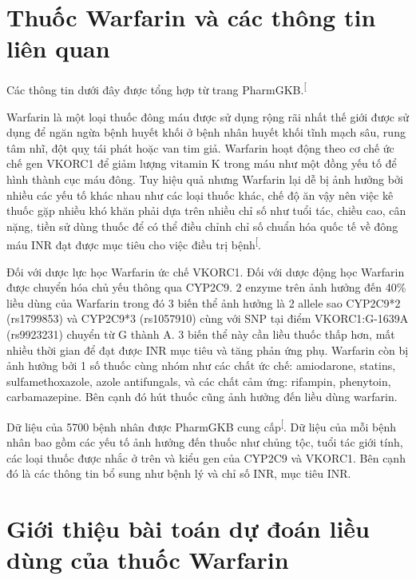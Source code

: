 \documentclass[14pt,oneside]{scrbook}
\begin{document}
\section{Thuốc Warfarin và các thông tin liên
quan}\label{thuux1ed1c-warfarin-vuxe0-cuxe1c-thuxf4ng-tin-liuxean-quan}

Các thông tin dưới đây được tổng hợp từ trang
PharmGKB.\textsuperscript{{[}\citeproc{ref-warfarin1}{1}{]}}

Warfarin là một loại thuốc đông máu được sử dụng rộng rãi nhất thế giới
được sử dụng để ngăn ngừa bệnh huyết khối ở bệnh nhân huyết khối tĩnh
mạch sâu, rung tâm nhĩ, đột quỵ tái phát hoặc van tim giả. Warfarin hoạt
động theo cơ chế ức chế gen VKORC1 để giảm lượng vitamin K trong máu như
một đồng yếu tố để hình thành cục máu đông. Tuy hiệu quả nhưng Warfarin
lại dễ bị ảnh hưởng bởi nhiều các yếu tố khác nhau như các loại thuốc
khác, chế độ ăn vậy nên việc kê thuốc gặp nhiều khó khăn phải dựa trên
nhiều chỉ số như tuổi tác, chiều cao, cân nặng, tiền sử dùng thuốc để có
thể điều chỉnh chỉ số chuẩn hóa quốc tế về đông máu INR đạt được mục
tiêu cho việc điều trị
bệnh\textsuperscript{{[}\citeproc{ref-inr}{5}{]}}.

Đối với dược lực học Warfarin ức chế VKORC1. Đối với dược động học
Warfarin được chuyển hóa chủ yếu thông qua CYP2C9. 2 enzyme trên ảnh
hưởng đến 40\% liều dùng của Warfarin trong đó 3 biến thể ảnh hưởng là 2
allele sao CYP2C9*2 (rs1799853) và CYP2C9*3 (rs1057910) cùng với SNP tại
điểm VKORC1:G-1639A (rs9923231) chuyển từ G thành A. 3 biến thể này cần
liều thuốc thấp hơn, mất nhiều thời gian để đạt được INR mục tiêu và
tăng phản ứng phụ. Warfarin còn bị ảnh hưởng bởi 1 số thuốc cùng nhóm
như các chất ức chế: amiodarone, statins, sulfamethoxazole, azole
antifungals, và các chất cảm ứng: rifampin, phenytoin, carbamazepine.
Bên cạnh đó hút thuốc cũng ảnh hưởng đến liều dùng warfarin.

Dữ liệu của 5700 bệnh nhân được PharmGKB cung
cấp\textsuperscript{{[}\citeproc{ref-warfarin-data}{6}{]}}. Dữ liệu của
mỗi bệnh nhân bao gồm các yếu tố ảnh hưởng đến thuốc như chủng tộc, tuổi
tác giới tính, các loại thuốc được nhắc ở trên và kiểu gen của CYP2C9 và
VKORC1. Bên cạnh đó là các thông tin bổ sung như bệnh lý và chỉ số INR,
mục tiêu INR.

\section{Giới thiệu bài toán dự đoán liều dùng của thuốc
Warfarin}\label{sec:1.3}
\end{document}
